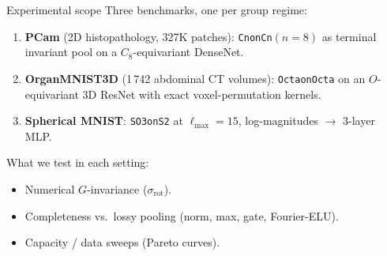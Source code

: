 \documentclass[10pt,aspectratio=169]{beamer}
\begin{document}
\begin{frame}{Experimental scope}
Three benchmarks, one per group regime:
\begin{enumerate}
  \item \textbf{PCam} (2D histopathology, 327K patches): \texttt{CnonCn}$(n{=}8)$
        as terminal invariant pool on a $C_8$-equivariant DenseNet.
  \item \textbf{OrganMNIST3D} (1\,742 abdominal CT volumes): \texttt{OctaonOcta}
        on an $O$-equivariant 3D ResNet with exact voxel-permutation kernels.
  \item \textbf{Spherical MNIST}: \texttt{SO3onS2} at $\ell_{\max}{=}15$,
        log-magnitudes $\to$ 3-layer MLP.
\end{enumerate}
\vspace{0.4em}
What we test in each setting:
\begin{itemize}
  \item Numerical $G$-invariance ($\sigma_\mathrm{rot}$).
  \item Completeness vs.\ lossy pooling (norm, max, gate, Fourier-ELU).
  \item Capacity / data sweeps (Pareto curves).
\end{itemize}
\end{frame}
\end{document}
